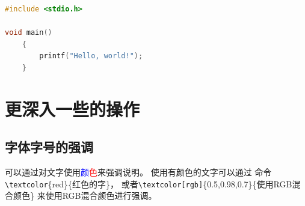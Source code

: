 \begin{lstlisting}[language={C}, caption={一段C源代码},label={sample-code}]
#include <stdio.h>

void main() 
	{
		printf("Hello, world!");
	}
\end{lstlisting}

\section{更深入一些的操作}
\label{sec-more}
\subsection{字体字号的强调}
\label{subsec-morefont}
可以通过对文字使用\textcolor{blue}{颜}\textcolor{red}{色}来强调说明。
使用\textcolor[rgb]{0.5,0.95,0.96}{有颜色的文字}可以通过
命令\texttt{\textbackslash textcolor}\{red\}\{红色的字\}，
或者\texttt{\textbackslash textcolor[rgb]}\{0.5,0.98,0.7\}\{使用RGB混合颜色\}
来\textcolor[rgb]{0.5,0.98,0.7}{使用RGB混合颜色}进行强调。

